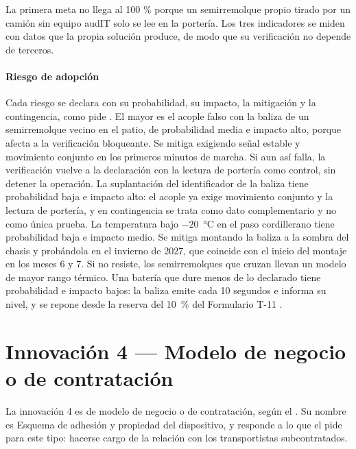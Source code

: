 La primera meta no llega al 100 \% porque un semirremolque propio tirado por un camión sin equipo
audIT solo se lee en la portería. Los tres indicadores se miden con datos que la propia solución
produce, de modo que su verificación no depende de terceros.

\paragraph{Riesgo de adopción} Cada riesgo se declara con su probabilidad, su impacto, la mitigación y
la contingencia, como pide . El mayor es el acople falso con la baliza de un
semirremolque vecino en el patio, de probabilidad media e impacto alto, porque afecta a la verificación
bloqueante. Se mitiga exigiendo señal estable y movimiento conjunto en los primeros minutos de marcha.
Si aun así falla, la verificación vuelve a la declaración con la lectura de portería como control, sin
detener la operación. La suplantación del identificador de la baliza tiene probabilidad baja e impacto
alto: el acople ya exige movimiento conjunto y la lectura de portería, y en contingencia se trata como
dato complementario y no como única prueba. La temperatura bajo $-20$~°C en el paso cordillerano tiene
probabilidad baja e impacto medio. Se mitiga montando la baliza a la sombra del chasis y probándola en
el invierno de 2027, que coincide con el inicio del montaje en los meses 6 y 7. Si no resiste, los
semirremolques que cruzan llevan un modelo de mayor rango térmico. Una batería que dure menos de lo
declarado tiene probabilidad e impacto bajos: la baliza emite cada 10 segundos e informa su nivel, y se
repone desde la reserva del 10~\% del Formulario T-11 \parencite{teltonika_eye}.


\section{Innovación 4 — Modelo de negocio o de contratación}\label{sec:13-innovacion-4}

La innovación 4 es de modelo de negocio o de contratación, según el . Su nombre es
Esquema de adhesión y propiedad del dispositivo, y responde a lo que el  pide
para este tipo: hacerse cargo de la relación con los transportistas subcontratados.

